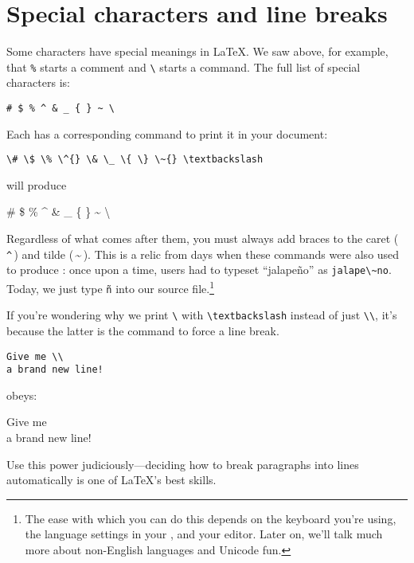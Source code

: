 \section{Special characters and line breaks}

Some characters have special meanings in \LaTeX.
We saw above, for example, that \verb|%| starts a comment
and \verb|\| starts a command.
The full list of special characters is:
\begin{leftfigure}
\begin{lstlisting}
# $ % ^ & _ { } ~ \
\end{lstlisting}
\end{leftfigure}
Each has a corresponding command
to print it in your document:
\begin{leftfigure}
\begin{lstlisting}
\# \$ \% \^{} \& \_ \{ \} \~{} \textbackslash
\end{lstlisting}
\end{leftfigure}
will produce
\begin{leftfigure}
\lm \# \$ \% \^{} \& \_ \{ \} \~{} \textbackslash
\end{leftfigure}
Regardless of what comes after them, you must always add braces to
the caret (\,\texttt{\^{}}\,) and tilde (\,\~{}\,).
This is a relic from days when these commands were also used to produce
:
once upon a time, users had to typeset ``jalapeño'' as
\verb|jalape\~no|.
Today, we just type \texttt{ñ} into our source
file.\punckern\footnote{The ease with which you can do this depends
on the keyboard you're using, the language settings in your ,
and your editor.
Later on, we'll talk much more about non-English languages and Unicode fun.}

If you're wondering why we print \texttt{\textbackslash} with
\verb|\textbackslash| instead of just \verb|\\|,
it's because the latter is the command to force a line break.
\begin{leftfigure}
\begin{lstlisting}
Give me \\
a brand new line!
\end{lstlisting}
\end{leftfigure}
obeys:
\begin{leftfigure}
\lm Give me \\
a brand new line!
\end{leftfigure}
Use this power judiciously---deciding how to break paragraphs into lines
automatically is one of \LaTeX{}'s best skills.

